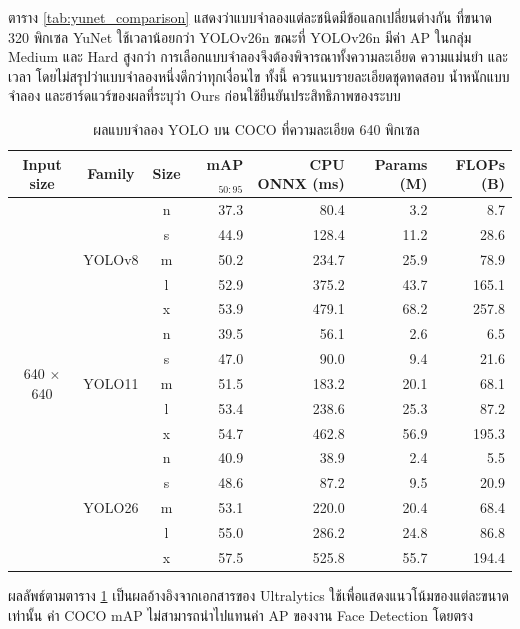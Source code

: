 ตาราง \ref{tab:yunet_comparison} แสดงว่าแบบจำลองแต่ละชนิดมีข้อแลกเปลี่ยนต่างกัน ที่ขนาด 320 พิกเซล YuNet ใช้เวลาน้อยกว่า YOLOv26n ขณะที่ YOLOv26n มีค่า AP ในกลุ่ม Medium และ Hard สูงกว่า การเลือกแบบจำลองจึงต้องพิจารณาทั้งความละเอียด ความแม่นยำ และเวลา โดยไม่สรุปว่าแบบจำลองหนึ่งดีกว่าทุกเงื่อนไข ทั้งนี้ ควรแนบรายละเอียดชุดทดสอบ น้ำหนักแบบจำลอง และฮาร์ดแวร์ของผลที่ระบุว่า Ours ก่อนใช้ยืนยันประสิทธิภาพของระบบ

\clearpage
\small
\setlength{\LTcapwidth}{\textwidth}
\begin{longtable}{c c c r r r r}
\caption[ผลแบบจำลอง YOLO บน COCO ที่ความละเอียด 640 พิกเซล]{ผลแบบจำลอง YOLO บน COCO ที่ความละเอียด 640 พิกเซล~\cite{ultralytics2023yolov8,ultralytics2024yolo11,ultralytics2026yolo26docs}}
\label{tab:yolo-family-reference}\\
\toprule
\textbf{Input size} & \textbf{Family} & \textbf{Size} & \textbf{mAP$_{50:95}$} & \textbf{CPU ONNX (ms)} & \textbf{Params (M)} & \textbf{FLOPs (B)} \\
\midrule
\multirow{15}{*}{640 $\times$ 640} & \multirow{5}{*}{YOLOv8} & n & 37.3 & 80.4 & 3.2 & 8.7 \\
 & & s & 44.9 & 128.4 & 11.2 & 28.6 \\
 & & m & 50.2 & 234.7 & 25.9 & 78.9 \\
 & & l & 52.9 & 375.2 & 43.7 & 165.1 \\
 & & x & 53.9 & 479.1 & 68.2 & 257.8 \\
\midrule
& \multirow{5}{*}{YOLO11} & n & 39.5 & 56.1 & 2.6 & 6.5 \\
 & & s & 47.0 & 90.0 & 9.4 & 21.6 \\
 & & m & 51.5 & 183.2 & 20.1 & 68.1 \\
 & & l & 53.4 & 238.6 & 25.3 & 87.2 \\
 & & x & 54.7 & 462.8 & 56.9 & 195.3 \\
\midrule
& \multirow{5}{*}{YOLO26} & n & 40.9 & 38.9 & 2.4 & 5.5 \\
 & & s & 48.6 & 87.2 & 9.5 & 20.9 \\
 & & m & 53.1 & 220.0 & 20.4 & 68.4 \\
 & & l & 55.0 & 286.2 & 24.8 & 86.8 \\
 & & x & 57.5 & 525.8 & 55.7 & 194.4 \\
\bottomrule
\end{longtable}



ผลลัพธ์ตามตาราง \ref{tab:yolo-family-reference} เป็นผลอ้างอิงจากเอกสารของ Ultralytics \cite{ultralytics2023yolov8,ultralytics2024yolo11,ultralytics2026yolo26docs} ใช้เพื่อแสดงแนวโน้มของแต่ละขนาดเท่านั้น ค่า COCO mAP ไม่สามารถนำไปแทนค่า AP ของงาน Face Detection โดยตรง
